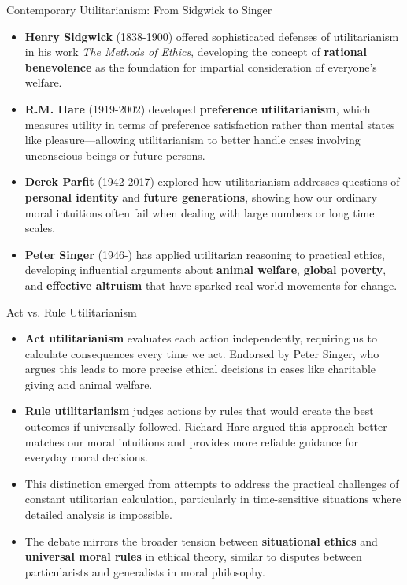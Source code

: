 \documentclass[aspectratio=169]{beamer}
\begin{document}
\begin{frame}{Contemporary Utilitarianism: From Sidgwick to Singer}
    \begin{itemize}
        \item \textbf{Henry Sidgwick} (1838-1900) offered sophisticated defenses of utilitarianism in his work \textit{The Methods of Ethics}, developing the concept of \textbf{rational benevolence} as the foundation for impartial consideration of everyone's welfare.
        
        \item \textbf{R.M. Hare} (1919-2002) developed \textbf{preference utilitarianism}, which measures utility in terms of preference satisfaction rather than mental states like pleasure—allowing utilitarianism to better handle cases involving unconscious beings or future persons.
        
        \item \textbf{Derek Parfit} (1942-2017) explored how utilitarianism addresses questions of \textbf{personal identity} and \textbf{future generations}, showing how our ordinary moral intuitions often fail when dealing with large numbers or long time scales.
        
        \item \textbf{Peter Singer} (1946-) has applied utilitarian reasoning to practical ethics, developing influential arguments about \textbf{animal welfare}, \textbf{global poverty}, and \textbf{effective altruism} that have sparked real-world movements for change.
    \end{itemize}
\end{frame}
\begin{frame}{Act vs. Rule Utilitarianism}
    \begin{itemize}
        \item \textbf{Act utilitarianism} evaluates each action independently, requiring us to calculate consequences every time we act. Endorsed by Peter Singer, who argues this leads to more precise ethical decisions in cases like charitable giving and animal welfare.
        
        \item \textbf{Rule utilitarianism} judges actions by rules that would create the best outcomes if universally followed. Richard Hare argued this approach better matches our moral intuitions and provides more reliable guidance for everyday moral decisions.
        
        \item This distinction emerged from attempts to address the practical challenges of constant utilitarian calculation, particularly in time-sensitive situations where detailed analysis is impossible.
        
        \item The debate mirrors the broader tension between \textbf{situational ethics} and \textbf{universal moral rules} in ethical theory, similar to disputes between particularists and generalists in moral philosophy.
    \end{itemize}
 \end{frame}
 
\end{document}
